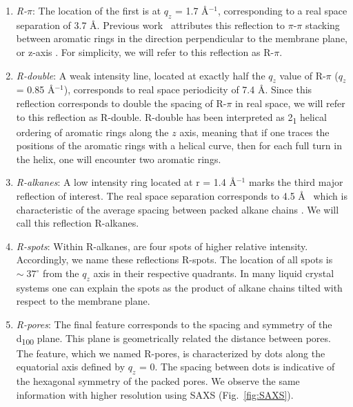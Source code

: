 \documentclass[journal=jpcbfk,manuscript=article]{achemso}
\begin{document}
  \begin{enumerate} 
  
	\item \textit{R-$\pi$}: The location of the first is at $q_z$ = 1.7
	\AA$^{-1}$, corresponding to a real space separation of 3.7 {\AA}. Previous
	work~\cite{feng_scalable_2014} attributes this reflection to $\pi$-$\pi$
	stacking between aromatic rings in the direction perpendicular to the membrane
	plane, or z-axis \cite{feng_scalable_2014}. For simplicity, we will refer to
	this reflection as R-$\pi$.
 
	\item \textit{R-double}: A weak intensity line, located at exactly half
	the $q_z$ value of R-$\pi$ ($q_z$ = 0.85 \AA$^{-1}$), corresponds to real
	space periodicity of 7.4 \AA. Since this reflection corresponds to double
	the spacing of R-$\pi$ in real space, we will refer to this reflection as R-double. 
	R-double has been interpreted as 2\textsubscript{1} helical ordering of aromatic
	rings along the $z$ axis\cite{feng_scalable_2014}, meaning that if one traces the 
	positions of the aromatic rings with a helical curve, then for each full turn 
	in the helix, one will encounter two aromatic rings.

	\item \textit{R-alkanes}: A low intensity ring located at r = 1.4
	\AA$^{-1}$ marks the third major reflection of interest. The real space
	separation corresponds to 4.5 \AA~ which is characteristic of the average
	spacing between packed alkane chains \cite{mcintosh_organization_1980}. We will
	call this reflection R-alkanes.

	\item \textit{R-spots}: Within R-alkanes, are four spots of higher
	relative intensity.  Accordingly, we name these reflections R-spots. The
	location of all spots is $\sim\;37^{\circ}$ from the $q_z$ axis in their
	respective quadrants. In many liquid crystal systems one can explain the spots
	as the product of alkane chains tilted with respect to the membrane
	plane\cite{govind_simple_2001}.
 
	\item \textit{R-pores}: The final feature corresponds to the spacing
	and symmetry of the d\textsubscript{100} plane. This plane is geometrically
	related the distance between pores. The feature, which we named R-pores, is
	characterized by dots along the equatorial axis defined by $q_z$ = 0. The
	spacing between dots is indicative of the hexagonal symmetry of the packed
	pores. We observe the same information with higher resolution using SAXS
	(Fig.~\ref{fig:SAXS}). 

  \end{enumerate}
\end{document}
